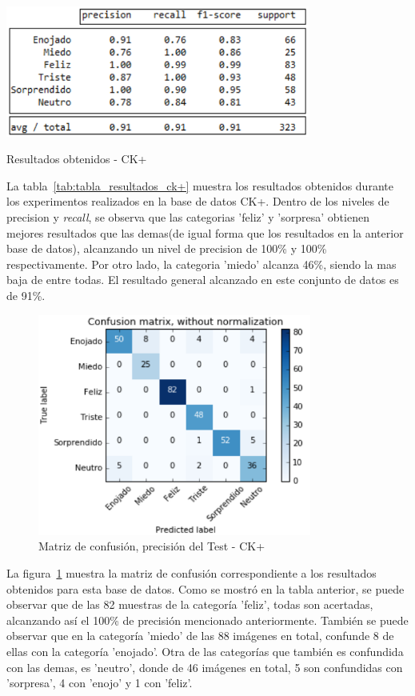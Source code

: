 \begin{table}[H]
    \centering
    \includegraphics[width=100mm]{Imagenes/tabla_resultados_ck+.png} 
    \caption{Resultados obtenidos - CK+}
    \label{tab:tabla_resultados_ck+}
\end{table}

La tabla~\ref{tab:tabla_resultados_ck+} muestra los resultados obtenidos durante los experimentos realizados en la base de datos CK+. Dentro de los niveles de precision y \textit{recall}, se observa que las categorias 'feliz' y 'sorpresa' obtienen mejores resultados que las demas(de igual forma que los resultados en la anterior base de datos), alcanzando un nivel de precision de 100\% y 100\% respectivamente. Por otro lado, la categoria 'miedo' alcanza 46\%, siendo la mas baja de entre todas. El resultado general alcanzado en este conjunto de datos es de 91\%.

\begin{figure}[H]
		\centering
		\includegraphics[width=90mm]{Imagenes/matriz_confusion_ck+.png}
		\caption{Matriz de confusión, precisión del Test - CK+}
		\label{fig:matriz_confusion_ck+}
\end{figure}

La figura~\ref{fig:matriz_confusion_ck+} muestra la matriz de confusión correspondiente a los resultados obtenidos para esta base de datos. Como se mostró en la tabla anterior, se puede observar que de las 82 muestras de la categoría 'feliz', todas son acertadas, alcanzando así el 100\% de precisión mencionado anteriormente. También se puede observar que en la categoría 'miedo' de las 88 imágenes en total, confunde 8 de ellas con la categoría 'enojado'. Otra de las categorías que también es confundida con las demas, es 'neutro', donde de 46 imágenes en total, 5 son confundidas con 'sorpresa', 4 con 'enojo' y 1 con 'feliz'.
 
